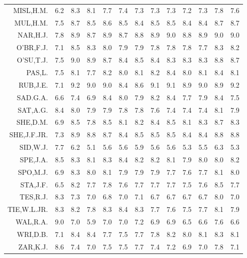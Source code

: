 \documentclass[nogin, dvips,12pt,a4paper,twoside]{amsart}
\begin{document}
\begin{table}[ht]
\begin{center}
{\begin{tabular}{rrrrrrrrrrrrr}
MISL,H.M.&6.2&8.3&8.1&7.7&7.4&7.3&7.3&7.3&7.2&7.3&7.8&7.6\\ 
MUL,H.M.&7.5&8.7&8.5&8.6&8.5&8.4&8.5&8.5&8.4&8.4&8.7&8.7\\ 
NAR,H.J.&7.8&8.9&8.7&8.9&8.7&8.8&8.9&9.0&8.8&8.9&9.0&9.0\\ 
O'BR,F.J.&7.1&8.5&8.3&8.0&7.9&7.9&7.8&7.8&7.8&7.7&8.3&8.2\\ 
O'SU,T.J.&7.5&9.0&8.9&8.7&8.4&8.5&8.4&8.3&8.3&8.3&8.8&8.7\\ 
PAS,L.&7.5&8.1&7.7&8.2&8.0&8.1&8.2&8.4&8.0&8.1&8.4&8.1\\ 
RUB,J.E.&7.1&9.2&9.0&9.0&8.4&8.6&9.1&9.1&8.9&9.0&8.9&9.2\\ 
SAD.G.A.&6.6&7.4&6.9&8.4&8.0&7.9&8.2&8.4&7.7&7.9&8.4&7.5\\ 
SAT,A.G.&8.4&8.0&7.9&7.9&7.8&7.8&7.6&7.4&7.4&7.4&8.1&7.9\\ 
SHE,D.M.&6.9&8.5&7.8&8.5&8.1&8.2&8.4&8.5&8.1&8.3&8.7&8.3\\ 
SHE,J.F.JR.&7.3&8.9&8.8&8.7&8.4&8.5&8.5&8.5&8.4&8.4&8.8&8.8\\ 
SID,W.J.&7.7&6.2&5.1&5.6&5.6&5.9&5.6&5.6&5.3&5.5&6.3&5.3\\ 
SPE,J.A.&8.5&8.3&8.1&8.3&8.4&8.2&8.2&8.1&7.9&8.0&8.0&8.2\\ 
SPO,M.J.&6.9&8.3&8.0&8.1&7.9&7.9&7.9&7.7&7.6&7.7&8.1&8.0\\ 
STA,J.F.&6.5&8.2&7.7&7.8&7.6&7.7&7.7&7.7&7.5&7.6&8.5&7.7\\ 
TES,R.J.&8.3&7.3&7.0&6.8&7.0&7.1&6.7&6.7&6.7&6.7&8.0&7.0\\ 
TIE,W.L.JR.&8.3&8.2&7.8&8.3&8.4&8.3&7.7&7.6&7.5&7.7&8.1&7.9\\ 
WAL,R.A.&9.0&7.0&5.9&7.0&7.0&7.2&6.9&6.9&6.5&6.6&7.6&6.6\\ 
WRI,D.B.&7.1&8.4&8.4&7.7&7.5&7.7&7.8&8.2&8.0&8.1&8.3&8.1\\ 
ZAR,K.J.&8.6&7.4&7.0&7.5&7.5&7.7&7.4&7.2&6.9&7.0&7.8&7.1\\ 

\end{tabular}}
\end{center}
\end{table}
\end{document}
